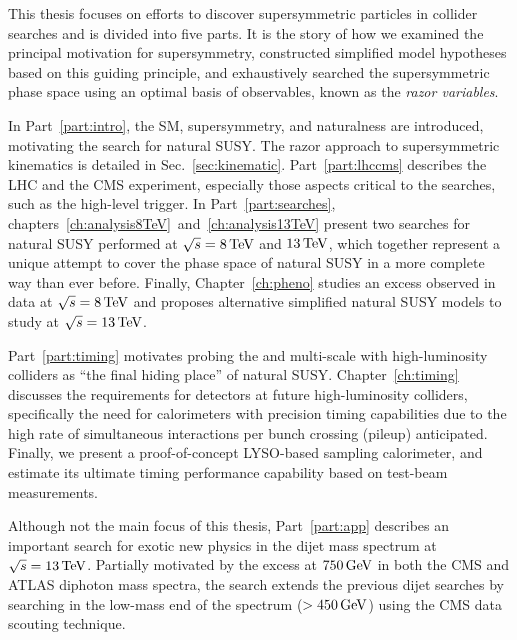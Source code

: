 This thesis focuses on efforts to discover supersymmetric
particles in collider searches and is divided into five parts. It is
the story of how we examined the principal motivation for supersymmetry,
constructed simplified model hypotheses based on this guiding
principle, and exhaustively searched the supersymmetric phase space
using an optimal basis of observables, known as the \emph{razor variables}.

In Part~\ref{part:intro}, the SM, supersymmetry, and naturalness are
introduced, motivating the search for natural SUSY. The razor approach
to supersymmetric kinematics is detailed in
Sec.~\ref{sec:kinematic}. Part~\ref{part:lhccms} describes the LHC and
the CMS experiment, especially those aspects critical to the searches,
such as the high-level trigger. In Part~\ref{part:searches}, chapters~\ref{ch:analysis8TeV}~and~\ref{ch:analysis13TeV} present
two searches for natural SUSY performed at $\sqrt{s}=8
\,\text{Te\hspace{-.08em}V}$ and $13 \,\text{Te\hspace{-.08em}V}$, which together represent a unique attempt to cover the phase space of
natural SUSY in a more complete way than ever before. Finally,
Chapter~\ref{ch:pheno} studies an excess observed in data at $\sqrt{s}=8
\,\text{Te\hspace{-.08em}V}$ and proposes alternative simplified natural SUSY models to study
at $\sqrt{s}=13 \,\text{Te\hspace{-.08em}V}$. 

Part~\ref{part:timing} motivates probing the \TeV and multi-\TeV scale
with high-luminosity colliders as ``the final hiding place'' of
natural SUSY. Chapter~\ref{ch:timing} discusses the
requirements for detectors at future high-luminosity colliders,
specifically the need for calorimeters with precision
timing capabilities due to the high rate of simultaneous interactions
per bunch crossing (pileup) anticipated. Finally, we present a
proof-of-concept LYSO-based sampling calorimeter, and estimate its
ultimate timing performance capability based on test-beam
measurements.

Although not the main focus of this thesis, Part~\ref{part:app}
describes an important search for exotic new physics in the dijet mass
spectrum at $\sqrt{s}=13 \,\text{Te\hspace{-.08em}V}$. Partially motivated by
the excess at $750 \,\text{Ge\hspace{-.08em}V}$ in both the CMS and ATLAS diphoton mass
spectra, the search extends the previous dijet searches by searching
in the low-mass end of the spectrum ($>450 \,\text{Ge\hspace{-.08em}V}$) using the
CMS data scouting technique.